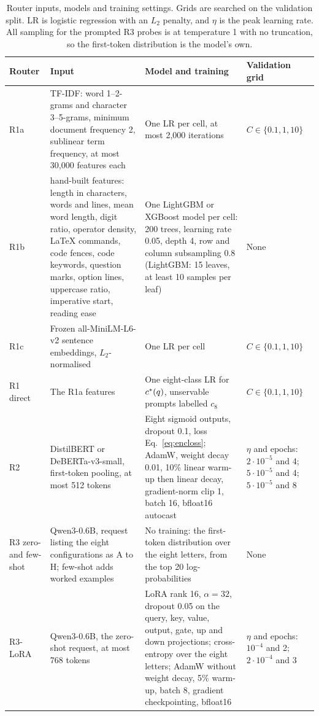 \begin{table}[ht]
\centering
\footnotesize
\caption{Router inputs, models and training settings. Grids are searched on
the validation split. LR is logistic regression with an $L_2$ penalty, and
$\eta$ is the peak learning rate. All sampling for the prompted R3 probes is
at temperature 1 with no truncation, so the first-token distribution is the
model's own.}
\label{tab:hyper}
\renewcommand{\arraystretch}{1.15}
\setlength{\tabcolsep}{4pt}
\begin{tabularx}{\textwidth}{@{}l >{\raggedright\arraybackslash}p{3.7cm} >{\raggedright\arraybackslash}X >{\raggedright\arraybackslash}p{3.5cm}@{}}
\toprule
Router & Input & Model and training & Validation grid \\
\midrule
R1a & TF-IDF: word 1--2-grams and character 3--5-grams, minimum document frequency 2, sublinear term frequency, at most 30{,}000 features each & One LR per cell, at most 2{,}000 iterations & $C \in \{0.1, 1, 10\}$ \\
R1b & 14 hand-built features: length in characters, words and lines, mean word length, digit ratio, operator density, LaTeX commands, code fences, code keywords, question marks, option lines, uppercase ratio, imperative start, reading ease & One LightGBM or XGBoost model per cell: 200 trees, learning rate 0.05, depth 4, row and column subsampling 0.8 (LightGBM: 15 leaves, at least 10 samples per leaf) & None \\
R1c & Frozen all-MiniLM-L6-v2 sentence embeddings, $L_2$-normalised & One LR per cell & $C \in \{0.1, 1, 10\}$ \\
R1 direct & The R1a features & One eight-class LR for $c^{*}(q)$, unservable prompts labelled $c_8$ & $C \in \{0.1, 1, 10\}$ \\
R2 & DistilBERT or DeBERTa-v3-small, first-token pooling, at most 512 tokens & Eight sigmoid outputs, dropout 0.1, loss Eq.~\eqref{eq:encloss}; AdamW, weight decay 0.01, 10\% linear warm-up then linear decay, gradient-norm clip 1, batch 16, bfloat16 autocast & $\eta$ and epochs: $2{\cdot}10^{-5}$ and 4; $5{\cdot}10^{-5}$ and 4; $5{\cdot}10^{-5}$ and 8 \\
R3 zero- and few-shot & Qwen3-0.6B, request listing the eight configurations as A to H; few-shot adds worked examples & No training: the first-token distribution over the eight letters, from the top 20 log-probabilities & None \\
R3-LoRA & Qwen3-0.6B, the zero-shot request, at most 768 tokens & LoRA rank 16, $\alpha = 32$, dropout 0.05 on the query, key, value, output, gate, up and down projections; cross-entropy over the eight letters; AdamW without weight decay, 5\% warm-up, batch 8, gradient checkpointing, bfloat16 & $\eta$ and epochs: $10^{-4}$ and 2; $2{\cdot}10^{-4}$ and 3 \\
\bottomrule
\end{tabularx}
\end{table}


